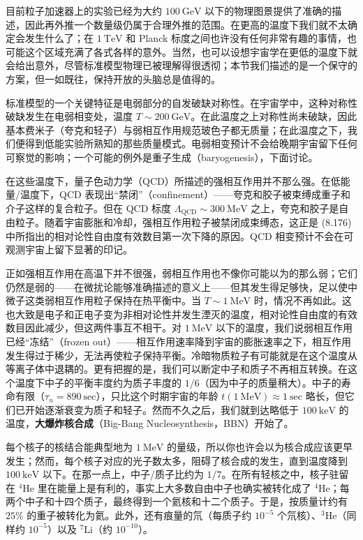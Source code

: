 目前粒子加速器上的实验已经为大约 $100~\mathrm{GeV}$ 以下的物理图景提供了准确的描述，因此再外推一个数量级仍属于合理外推的范围。在更高的温度下我们就不太确定会发生什么了；在 $1~\mathrm{TeV}$ 和 Planck 标度之间也许没有任何非常有趣的事情，也可能这个区域充满了各式各样的意外。当然，也可以设想宇宙学在更低的温度下就会给出意外，尽管标准模型物理已被理解得很透彻；本节我们描述的是一个保守的方案，但一如既往，保持开放的头脑总是值得的。

标准模型的一个关键特征是电弱部分的自发破缺对称性。在宇宙学中，这种对称性破缺发生在电弱相变处，温度 $T\sim 200~\mathrm{GeV}$。在此温度之上对称性尚未破缺，因此基本费米子（夸克和轻子）与弱相互作用规范玻色子都无质量；在此温度之下，我们便得到低能实验所熟知的那些质量模式。电弱相变预计不会给晚期宇宙留下任何可察觉的影响；一个可能的例外是重子生成（baryogenesis），下面讨论。

在这些温度下，量子色动力学（QCD）所描述的强相互作用并不那么强。在低能量/温度下，QCD 表现出“禁闭”（confinement）——夸克和胶子被束缚成重子和介子这样的复合粒子。但在 QCD 标度 $\Lambda_{\mathrm{QCD}}\sim 300~\mathrm{MeV}$ 之上，夸克和胶子是自由粒子。随着宇宙膨胀和冷却，强相互作用粒子被禁闭成束缚态，这正是 (8.176) 中所指出的相对论性自由度有效数目第一次下降的原因。QCD 相变预计不会在可观测宇宙上留下显著的印记。

正如强相互作用在高温下并不很强，弱相互作用也不像你可能以为的那么弱；它们仍然是弱的——在微扰论能够准确描述的意义上——但其发生得足够快，足以使中微子这类弱相互作用粒子保持在热平衡中。当 $T\sim 1~\mathrm{MeV}$ 时，情况不再如此。这也大致是电子和正电子变为非相对论性并发生湮灭的温度，相对论性自由度的有效数目因此减少，但这两件事互不相干。对 $1~\mathrm{MeV}$ 以下的温度，我们说弱相互作用已经“冻结”（frozen out）——相互作用速率降到宇宙的膨胀速率之下，相互作用发生得过于稀少，无法再使粒子保持平衡。冷暗物质粒子有可能就是在这个温度从等离子体中退耦的。更有把握的是，我们可以断定中子和质子不再相互转换。在这个温度下中子的平衡丰度约为质子丰度的 $1/6$（因为中子的质量稍大）。中子的寿命有限（$\tau_{n}=890~\mathrm{sec}$），只比这个时期宇宙的年龄 $t(1~\mathrm{MeV})\approx 1~\mathrm{sec}$ 略长，但它们已开始逐渐衰变为质子和轻子。然而不久之后，我们就到达略低于 $100~\mathrm{keV}$ 的温度，\textbf{大爆炸核合成}（Big-Bang Nucleosynthesis，BBN）开始了。

每个核子的核结合能典型地为 $1~\mathrm{MeV}$ 的量级，所以你也许会以为核合成应该更早发生；然而，每个核子对应的光子数太多，阻碍了核合成的发生，直到温度降到 $100~\mathrm{keV}$ 以下。在那一点上，中子/质子比约为 $1/7$。在所有轻核之中，核子驻留在 $^{4}\mathrm{He}$ 里在能量上是有利的，事实上大多数自由中子也确实被转化成了 $^{4}\mathrm{He}$；每两个中子和十四个质子，最终得到一个氦核和十二个质子。于是，按质量计约有 $25\%$ 的重子被转化为氦。此外，还有痕量的氘（每质子约 $10^{-5}$ 个氘核）、$^{3}\mathrm{He}$（同样约 $10^{-5}$）以及 $^{7}\mathrm{Li}$（约 $10^{-10}$）。

